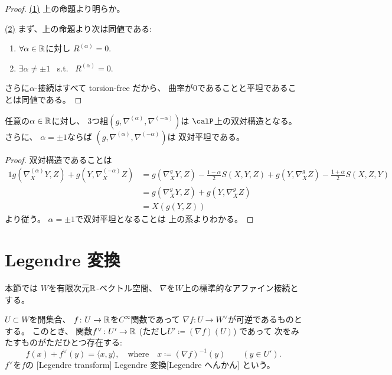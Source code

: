 \documentclass[report]{jlreq}
\begin{document}
\begin{proof}
    \uline{(1)} \quad
    上の命題より明らか。

    \uline{(2)} \quad
    まず、上の命題より次は同値である:
    \begin{enumerate}
        \item $\forall \alpha \in \mathbb{R}$に対し
            $R^{(\alpha)} = 0$.
        \item $\exists \alpha \neq \pm 1$
            \, s.t. \,
            $R^{(\alpha)} = 0$.
    \end{enumerate}
    さらに$\alpha$-接続はすべて torsion-free だから、
    曲率が$0$であることと平坦であることは同値である。
\end{proof}

\begin{theorem}
    任意の$\alpha \in \mathbb{R}$に対し、
    3つ組$(g, \nabla^{(\alpha)}, \nabla^{(-\alpha)})$は
    $\calP$上の双対構造となる。
    さらに、
    $\alpha = \pm 1$ならば
    $(g, \nabla^{(\alpha)}, \nabla^{(-\alpha)})$は
    双対平坦である。
\end{theorem}

\begin{proof}
    双対構造であることは
    \begin{alignat}{1}
        g(\nabla^{(\alpha)}_X Y, Z)
            + g(Y, \nabla^{(-\alpha)}_X Z)
            &=
                g(\nabla^{g}_X Y, Z)
                - \frac{1 - \alpha}{2} S(X, Y, Z)
                + g(Y, \nabla^{g}_X Z)
                - \frac{1 + \alpha}{2} S(X, Z, Y)
                \\
            &=
                g(\nabla^{g}_X Y, Z)
                + g(Y, \nabla^{g}_X Z)
                \\
            &=
                X(g(Y, Z))
    \end{alignat}
    より従う。
    $\alpha = \pm 1$で双対平坦となることは
    上の系よりわかる。
\end{proof}

%
\section{Legendre 変換}

本節では
$W$を有限次元$\mathbb{R}$-ベクトル空間、
$\nabla$を$W$上の標準的なアファイン接続とする。

\begin{propdef}
    $U \subset W$を開集合、
    $f \colon U \to \mathbb{R}$を$C^\infty$関数であって
    $\nabla f \colon U \to W^\vee$が可逆であるものとする。
    このとき、
    関数$f^\vee \colon U' \to \mathbb{R}$ \;
    (ただし$U' \coloneqq (\nabla f)(U)$)
    であって
    次をみたすものがただひとつ存在する:
    \begin{equation}
        f(x) + f^\vee(y) = \langle x, y \rangle,
            \quad \text{where} \quad
            x \coloneqq (\nabla f)^{-1}(y)
            \qquad (y \in U').
    \end{equation}
    $f^\vee$を$f$の
    [Legendre transform]
        {Legendre 変換}[Legendre へんかん]
    という。
\end{propdef}
\end{document}
